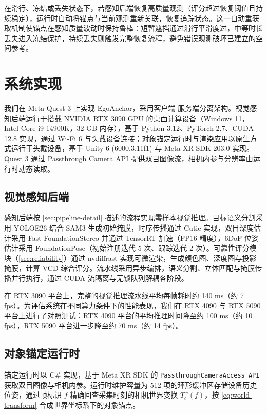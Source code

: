 \documentclass[review]{vgtc}
\begin{document}
在滑行、冻结或丢失状态下，若感知后端恢复高质量观测（评分超过恢复阈值且持续稳定），运行时自动将锚点与当前观测重新关联，恢复追踪状态。这一自动重获取机制使锚点在感知质量波动时保持鲁棒：短暂遮挡通过滑行平滑度过，中等时长丢失进入冻结保护，持续丢失则触发完整恢复流程，避免错误观测破坏已建立的空间参考。

\section{系统实现}\label{sec:impl}


我们在 Meta Quest 3 上实现 EgoAnchor，采用客户端-服务端分离架构。视觉感知后端运行于搭载 NVIDIA RTX 3090 GPU 的桌面计算设备（Windows 11，Intel Core i9-14900K，32 GB 内存），基于 Python 3.12、PyTorch 2.7、CUDA 12.8 实现，通过 Wi-Fi 6 与头戴设备连接；对象锚定运行时与渲染应用以原生方式运行于头戴设备，基于 Unity 6 (6000.3.11f1) 与 Meta XR SDK 203.0 实现。Quest 3 通过 Passthrough Camera API 提供双目图像流，相机内参与分辨率由运行时动态读取。

\subsection{视觉感知后端}


感知后端按 \ref{sec:pipeline-detail} 描述的流程实现零样本视觉推理。目标语义分割采用 YOLOE26 结合 SAM3 生成初始掩膜，时序传播通过 Cutie 实现，双目深度估计采用 Fast-FoundationStereo 并通过 TensorRT 加速（FP16 精度），6DoF 位姿估计采用 FoundationPose（初始注册迭代 5 次、跟踪迭代 2 次）。可靠性评分模块（\ref{sec:reliability}）通过 nvdiffrast 实现可微渲染，生成颜色图、深度图与投影掩膜，计算 VCD 综合评分。流水线采用异步编排，语义分割、立体匹配与掩膜传播并行执行，通过 CUDA 流隔离与无锁队列解耦各阶段。

在 RTX 3090 平台上，完整的视觉推理流水线平均每帧耗时约 140 ms（约 7 fps）。为评估系统在不同算力条件下的性能表现，我们在 RTX 4090 与 RTX 5090 平台上进行了对照测试：RTX 4090 平台的平均推理时间降至约 100 ms（约 10 fps），RTX 5090 平台进一步降至约 70 ms（约 14 fps）。

\subsection{对象锚定运行时}


锚定运行时以 C\# 实现，基于 Meta XR SDK 的 \texttt{PassthroughCameraAccess API} 获取双目图像与相机内参。运行时维护容量为 512 项的环形缓冲区存储设备历史位姿，通过帧标识 $f$ 精确回查采集时刻的相机世界变换 $T_c^w (f)$，按 \ref{eq:world-transform} 合成世界坐标系下的对象锚点。
\end{document}
